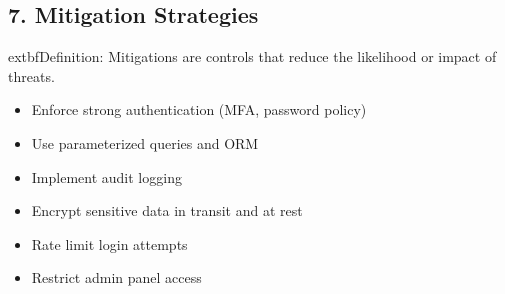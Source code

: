 \subsection*{7. Mitigation Strategies}
	extbf{Definition:} Mitigations are controls that reduce the likelihood or impact of threats\cite{owasp}.
\begin{itemize}
	\item Enforce strong authentication (MFA, password policy)
	\item Use parameterized queries and ORM
	\item Implement audit logging
	\item Encrypt sensitive data in transit and at rest
	\item Rate limit login attempts
	\item Restrict admin panel access
\end{itemize}
